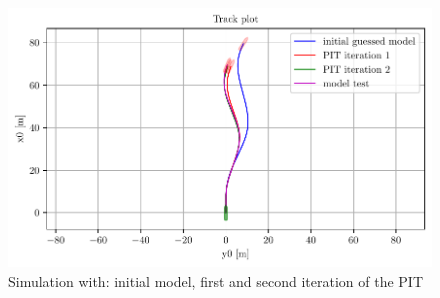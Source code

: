 \begin{figure}[H]
    \centering
    \includegraphics[width=\textwidth]{kappa/images/0.pdf}
    \caption{Simulation with: initial model, first and second iteration of the PIT}
    \label{\detokenize{01.01_method:iterations}}
\end{figure}

